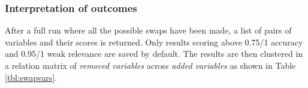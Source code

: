 \subsubsection{Interpretation of outcomes}
After a full run where all the possible swaps have been made, a list of pairs of variables and their scores is returned. Only results scoring above 0.75/1 accuracy and 0.95/1 weak relevance are saved by default. The results are then clustered in a relation matrix of \textit{removed variables} across \textit{added variables} as shown in Table \ref{tbl:swapvars}. 

\begin{table}[]
\centering
{}
\label{tbl:swapvars}
\caption{Weak relevance relation matrix. Row indexes include the removed variable from the original set and column names contain the variables they have been swapped for. The relation value summarises the number of times a swap has resulted in a score > 0.75 and the weak relevance score > 0.95.}
\end{table}

